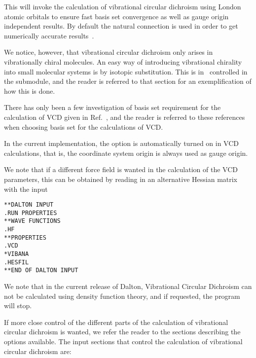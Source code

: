This will invoke the calculation of vibrational circular dichroism
using London atomic orbitals to ensure fast
basis set convergence as
well as gauge origin independent results. By
default the natural
connection is used in order to get
numerically accurate
results~\cite{joklbkrthpjtca90,krthjopjklbcpl235}.

We notice, however, that vibrational circular dichroism only arises in
vibrationally chiral molecules. An easy way of introducing
vibrational chirality into small molecular systems is by isotopic
substitution. This is in
\dalton\ controlled in the  submodule, and the reader is
referred to that section for an exemplification of how this is done.

There has only  been a few investigation of basis set requirement for
the calculation of VCD given in
Ref.~\cite{klbpjthkrhjajjcp100,klbpjthkrfd99},
and the reader is referred to these references when choosing basis set
for the calculations of VCD.

In the current implementation, the  option is automatically
turned on in VCD calculations, that is, the coordinate system origin
is always used as gauge origin.

We note that if a different force field is wanted in the calculation
of the VCD parameters, this can be obtained by reading in an
alternative Hessian matrix with the input

\begin{verbatim}
**DALTON INPUT
.RUN PROPERTIES
**WAVE FUNCTIONS
.HF
**PROPERTIES
.VCD
*VIBANA
.HESFIL
**END OF DALTON INPUT
\end{verbatim}

We note that in the current release of Dalton, Vibrational Circular
Dichroism can not be calculated using density function theory, and if
requested, the program will stop.

If more close control of the different parts of the calculation of
vibrational circular dichroism is wanted, we refer the reader to the
sections describing the options available. The input sections that control
the calculation of vibrational circular dichroism are:

